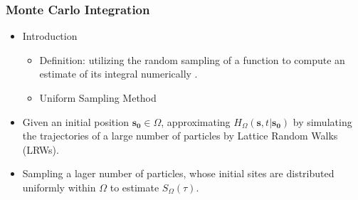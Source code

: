       \subsubsection{Monte Carlo Integration}
        \begin{itemize}
           \item Introduction
             \begin{itemize}
               \item Definition: utilizing the random sampling of a function to compute an estimate of its integral numerically \cite{hammersley1960monte}.
               \item Uniform Sampling Method
             \end{itemize}
           \item Given an initial position $\bm{s_0} \in \Omega$, approximating $H_{\Omega}(\bm{s}, t | \bm{s_0})$ by simulating the trajectories of a large number of particles by Lattice Random Walks (LRWs).
           \item Sampling a lager number of particles, whose initial sites are distributed uniformly within $\Omega$ to estimate $S_{\Omega}(\tau)$.
        \end{itemize}
        
